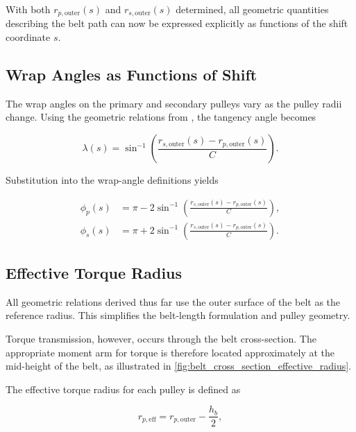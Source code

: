 \documentclass[11pt]{article}
\numberwithin{equation}{section}
\begin{document}
With both $r_{p,\mathrm{outer}}(s)$ and $r_{s,\mathrm{outer}}(s)$ determined,
all geometric quantities describing the belt path can now be expressed
explicitly as functions of the shift coordinate $s$.

\subsection{Wrap Angles as Functions of Shift}\label{sec:wrap_angles}

The wrap angles on the primary and secondary pulleys
vary as the pulley radii change. Using the geometric relations from
, the tangency angle becomes

\begin{equation}
\lambda(s)
=
\sin^{-1}\!\left(
\frac{
r_{s,\mathrm{outer}}(s)
-
r_{p,\mathrm{outer}}(s)
}{C}
\right).
\end{equation}

Substitution into the wrap-angle definitions yields

\begin{align}
\phi_p(s)
&=
\pi
-
2\sin^{-1}\!\left(
\frac{
r_{s,\mathrm{outer}}(s)
-
r_{p,\mathrm{outer}}(s)
}{C}
\right),\label{eq:wrap_angle_primary}\\[8pt]
\phi_s(s)
&=
\pi
+
2\sin^{-1}\!\left(
\frac{
r_{s,\mathrm{outer}}(s)
-
r_{p,\mathrm{outer}}(s)
}{C}
\right).\label{eq:wrap_angle_secondary}
\end{align}



\subsection{Effective Torque Radius}
\label{sec:effective-radius-placeholder}

All geometric relations derived thus far use the outer surface of the belt
as the reference radius. This simplifies the belt-length formulation and
pulley geometry.

Torque transmission, however, occurs through the belt cross-section.
The appropriate moment arm for torque is therefore located
approximately at the mid-height of the belt, as illustrated in 
\cref{fig:belt_cross_section_effective_radius}.

The effective torque radius for each pulley is defined as

\begin{equation}
r_{p,\text{eff}} = r_{p,\text{outer}} - \frac{h_b}{2},
\label{eq:primary_effective_radius}
\end{equation}
\end{document}
